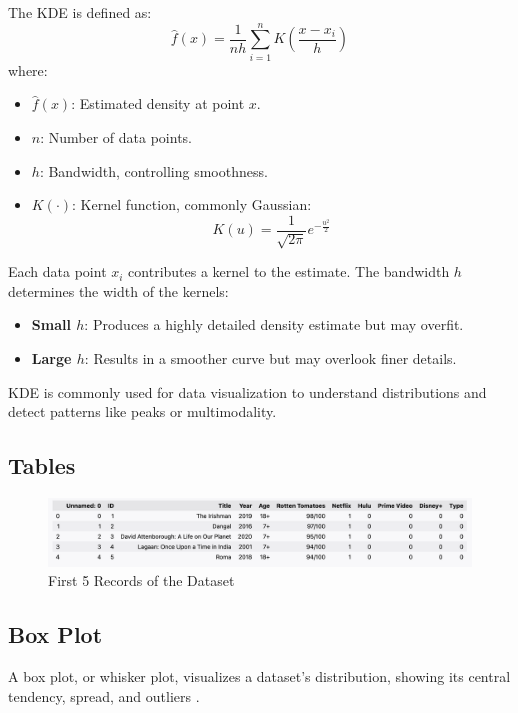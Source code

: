 \documentclass[a4paper, 12pt]{article}
\begin{document}
The KDE is defined as:
\[
\hat{f}(x) = \frac{1}{n h} \sum_{i=1}^{n} K\left(\frac{x - x_i}{h}\right)
\]
where:
\begin{itemize}
    \item \(\hat{f}(x)\): Estimated density at point \(x\).
    \item \(n\): Number of data points.
    \item \(h\): Bandwidth, controlling smoothness.
    \item \(K(\cdot)\): Kernel function, commonly Gaussian:
    \[
    K(u) = \frac{1}{\sqrt{2\pi}} e^{-\frac{u^2}{2}}
    \]
\end{itemize}

Each data point \(x_i\) contributes a kernel to the estimate. The bandwidth \(h\) determines the width of the kernels:
\begin{itemize}
    \item \textbf{Small \(h\)}: Produces a highly detailed density estimate but may overfit.
    \item \textbf{Large \(h\)}: Results in a smoother curve but may overlook finer details.
\end{itemize}

KDE is commonly used for data visualization to understand distributions and detect patterns like peaks or multimodality.
\cite{parzen1962}

\subsection{Tables}
\label{appendix:table}

\begin{figure}[H]
    \centering
    \includegraphics[width=1\textwidth]{head.png} %
    \caption{First 5 Records of the Dataset}
    \label{fig:datatable}
\end{figure}

\subsection{Box Plot} \label{appendix:box_plot}
A box plot, or whisker plot, visualizes a dataset’s distribution, showing its central tendency, spread, and outliers \cite{mcgill1978boxplots}.
\end{document}
